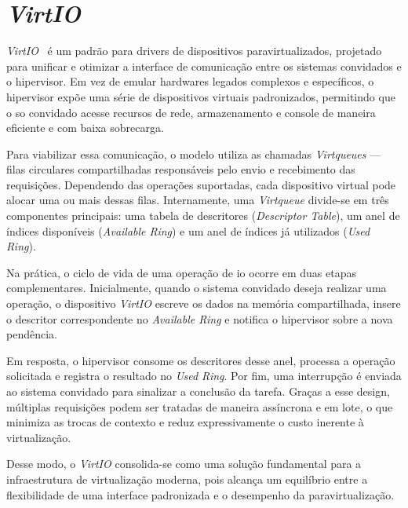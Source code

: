 \section{\textit{VirtIO}}

\textit{VirtIO}~\cite{rusty-virtio} é um padrão para drivers de dispositivos paravirtualizados, projetado para unificar e otimizar a interface de comunicação entre os
sistemas convidados e o hipervisor. Em vez de emular hardwares legados complexos e específicos, o hipervisor expõe uma série de dispositivos virtuais padronizados, permitindo que
o \gls{so} convidado acesse recursos de rede, armazenamento e console de maneira eficiente e com baixa sobrecarga.

Para viabilizar essa comunicação, o modelo utiliza as chamadas \textit{Virtqueues} — filas circulares compartilhadas responsáveis pelo envio e recebimento das requisições.
Dependendo das operações suportadas, cada dispositivo virtual pode alocar uma ou mais dessas filas. Internamente, uma \textit{Virtqueue} divide-se em três componentes principais:
uma tabela de descritores (\textit{Descriptor Table}), um anel de índices disponíveis (\textit{Available Ring}) e um anel de índices já utilizados (\textit{Used Ring}).

Na prática, o ciclo de vida de uma operação de \gls{io} ocorre em duas etapas complementares. Inicialmente, quando o sistema convidado deseja realizar uma operação, o dispositivo \textit{VirtIO}
escreve os dados na memória compartilhada, insere o descritor correspondente no \textit{Available Ring} e notifica o hipervisor sobre a nova pendência. 

Em resposta, o hipervisor consome os descritores desse anel, processa a operação solicitada e registra o resultado no \textit{Used Ring}. Por fim, uma interrupção
é enviada ao sistema convidado para sinalizar a conclusão da tarefa. Graças a esse design, múltiplas requisições podem ser tratadas de maneira assíncrona e em lote, o que minimiza
as trocas de contexto e reduz expressivamente o custo inerente à virtualização.

Desse modo, o \textit{VirtIO} consolida-se como uma solução fundamental para a infraestrutura de virtualização moderna, pois alcança um equilíbrio entre a flexibilidade de uma interface padronizada e o
desempenho da paravirtualização.


